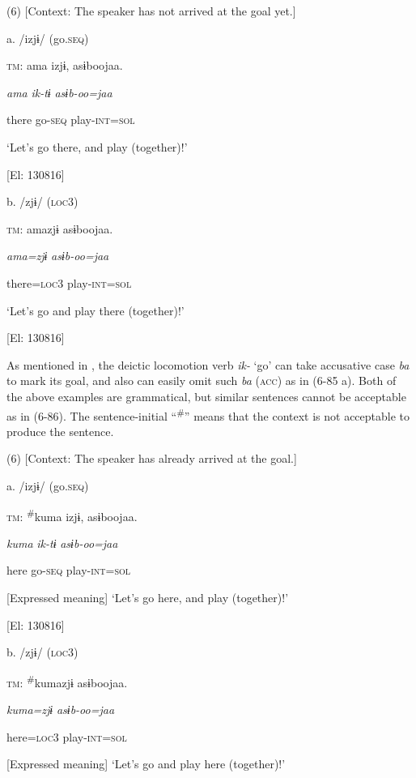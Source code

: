 (6)  [Context: The speaker has not arrived at the goal yet.]

  a.  /izjɨ/ (go.\textsc{seq})

    \textsc{tm}:  ama  izjɨ,  asɨboojaa.

      \textit{ama}  \textit{ik-tɨ}  \textit{asɨb-oo=jaa}

      there  go-\textsc{seq}  play-\textsc{int}=\textsc{sol}

      ‘Let’s go there, and play (together)!’

    [El: 130816]

  b.  /zjɨ/ (\textsc{loc}3)

    \textsc{tm}:  amazjɨ  asɨboojaa.

      \textit{ama=zjɨ}  \textit{asɨb-oo=jaa}

      there=\textsc{loc}3  play-\textsc{int}=\textsc{sol}

      ‘Let’s go and play there (together)!’

    [El: 130816]

As mentioned in , the deictic locomotion verb \textit{ik-} ‘go’ can take accusative case \textit{ba} to mark its goal, and also can easily omit such \textit{ba} (\textsc{acc}) as in (6-85 a). Both of the above examples are grammatical, but similar sentences cannot be acceptable as in (6-86). The sentence-initial “\textsuperscript{\#}” means that the context is not acceptable to produce the sentence.

(6)  [Context: The speaker has already arrived at the goal.]

  a.  /izjɨ/ (go.\textsc{seq})

    \textsc{tm}:  \textsuperscript{\#}kuma  izjɨ,  asɨboojaa.

      \textit{kuma}  \textit{ik-tɨ}  \textit{asɨb-oo=jaa}

      here  go-\textsc{seq}  play-\textsc{int}=\textsc{sol}

      [Expressed meaning] ‘Let’s go here, and play (together)!’

    [El: 130816]

  b.  /zjɨ/ (\textsc{loc}3)

    \textsc{tm}:  \textsuperscript{\#}kumazjɨ  asɨboojaa.

      \textit{kuma=zjɨ}  \textit{asɨb-oo=jaa}

      here=\textsc{loc}3  play-\textsc{int}=\textsc{sol}

      [Expressed meaning] ‘Let’s go and play here (together)!’

